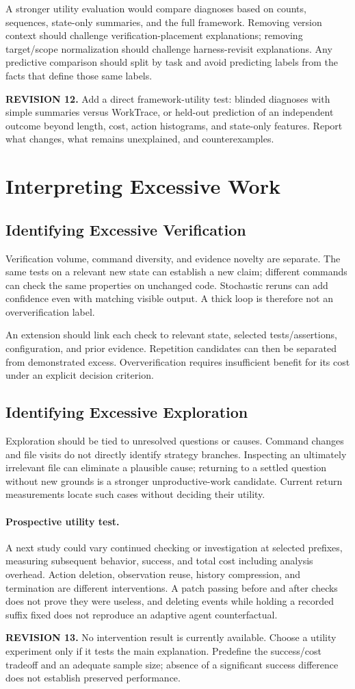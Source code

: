\documentclass[10pt,a4paper,twocolumn]{article}
\newcommand{\rev}[2]{\par\smallskip\noindent\begin{minipage}{\linewidth}\color{revision}\footnotesize\textbf{REVISION #1.} #2\end{minipage}\par\smallskip}
\begin{document}
A stronger utility evaluation would compare diagnoses based on counts, sequences, state-only summaries, and the full framework. Removing version context should challenge verification-placement explanations; removing target/scope normalization should challenge harness-revisit explanations. Any predictive comparison should split by task and avoid predicting labels from the facts that define those same labels.
\rev{12}{Add a direct framework-utility test: blinded diagnoses with simple summaries versus WorkTrace, or held-out prediction of an independent outcome beyond length, cost, action histograms, and state-only features. Report what changes, what remains unexplained, and counterexamples.}

\section{Interpreting Excessive Work}
\subsection{Identifying Excessive Verification}
Verification volume, command diversity, and evidence novelty are separate. The same tests on a relevant new state can establish a new claim; different commands can check the same properties on unchanged code. Stochastic reruns can add confidence even with matching visible output. A thick loop is therefore not an oververification label.

An extension should link each check to relevant state, selected tests/assertions, configuration, and prior evidence. Repetition candidates can then be separated from demonstrated excess. Oververification requires insufficient benefit for its cost under an explicit decision criterion.
\subsection{Identifying Excessive Exploration}
Exploration should be tied to unresolved questions or causes. Command changes and file visits do not directly identify strategy branches. Inspecting an ultimately irrelevant file can eliminate a plausible cause; returning to a settled question without new grounds is a stronger unproductive-work candidate. Current return measurements locate such cases without deciding their utility.
\paragraph{Prospective utility test.}
A next study could vary continued checking or investigation at selected prefixes, measuring subsequent behavior, success, and total cost including analysis overhead. Action deletion, observation reuse, history compression, and termination are different interventions. A patch passing before and after checks does not prove they were useless, and deleting events while holding a recorded suffix fixed does not reproduce an adaptive agent counterfactual.
\rev{13}{No intervention result is currently available. Choose a utility experiment only if it tests the main explanation. Predefine the success/cost tradeoff and an adequate sample size; absence of a significant success difference does not establish preserved performance.}
\end{document}
